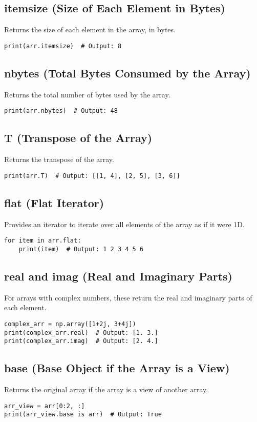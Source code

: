 \documentclass[a4paper, 12pt]{article}
\begin{document}
\subsection{itemsize (Size of Each Element in Bytes)}
Returns the size of each element in the array, in bytes.
\begin{lstlisting}
print(arr.itemsize)  # Output: 8
\end{lstlisting}

\subsection{nbytes (Total Bytes Consumed by the Array)}
Returns the total number of bytes used by the array.
\begin{lstlisting}
print(arr.nbytes)  # Output: 48
\end{lstlisting}

\subsection{T (Transpose of the Array)}
Returns the transpose of the array.
\begin{lstlisting}
print(arr.T)  # Output: [[1, 4], [2, 5], [3, 6]]
\end{lstlisting}

\subsection{flat (Flat Iterator)}
Provides an iterator to iterate over all elements of the array as if it were 1D.
\begin{lstlisting}
for item in arr.flat:
    print(item)  # Output: 1 2 3 4 5 6
\end{lstlisting}

\subsection{real and imag (Real and Imaginary Parts)}
For arrays with complex numbers, these return the real and imaginary parts of each element.
\begin{lstlisting}
complex_arr = np.array([1+2j, 3+4j])
print(complex_arr.real)  # Output: [1. 3.]
print(complex_arr.imag)  # Output: [2. 4.]
\end{lstlisting}

\subsection{base (Base Object if the Array is a View)}
Returns the original array if the array is a view of another array.
\begin{lstlisting}
arr_view = arr[0:2, :]
print(arr_view.base is arr)  # Output: True
\end{lstlisting}
\end{document}
